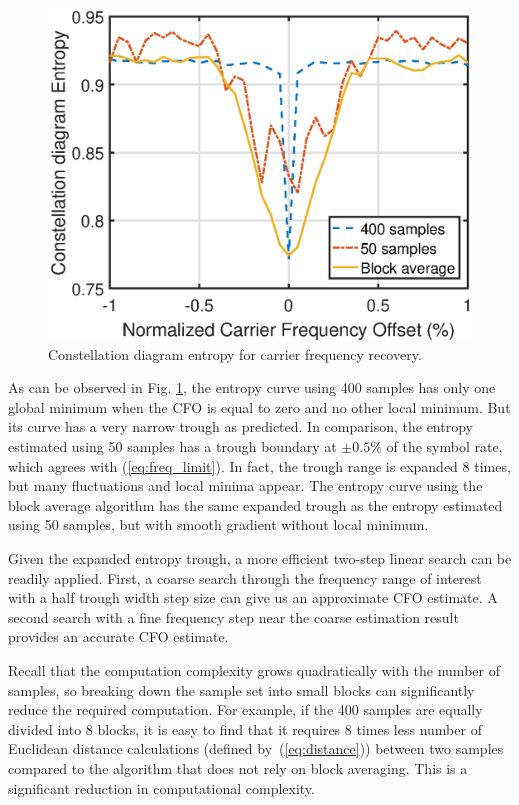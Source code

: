 \documentclass[journal,comsoc, onecolumn, 12pt,draftclsnofoot]{IEEEtran} %
\begin{document}
\begin{figure}[ht]
\centering
\includegraphics[width=3 in]{pic/freq.eps}
\caption{Constellation diagram entropy for carrier frequency recovery.}
\label{fig:freq_entp} 
\end{figure}   

As can be observed in Fig. \ref{fig:freq_entp}, the entropy curve using 400 samples has only one global minimum when the CFO is equal to zero and no other local minimum.
But its curve has a very narrow trough as predicted.
In comparison, the entropy estimated using 50 samples has a trough boundary at \(\pm 0.5\%\) of the symbol rate, which agrees with (\ref{eq:freq_limit}).
In fact, the trough range is expanded 8 times, but many fluctuations and local minima appear.
The entropy curve using the block average algorithm has the same expanded trough as the entropy estimated using 50 samples, but with smooth gradient without local minimum.

Given the expanded entropy trough, a more efficient two-step linear search can be readily applied.
First, a coarse search through the frequency range of interest with a half trough width step size can give us an approximate CFO estimate.
A second search with a fine frequency step near the coarse estimation result provides an accurate CFO estimate.

Recall that the computation complexity grows quadratically with the number of samples, so breaking down the sample set into small blocks can significantly reduce the required computation.
For example, if the 400 samples are equally divided into 8 blocks, it is easy to find that it requires 8 times less number of Euclidean distance calculations (defined by~(\ref{eq:distance})) between two samples compared to the algorithm that does not rely on block averaging. This is a significant reduction in computational complexity. 
\end{document}
